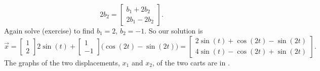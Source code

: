 \begin{example}
\begin{equation*}
2 b_2
=
\begin{bmatrix} b_1+2b_2 \\ 2b_1-2b_2 \end{bmatrix} .
\end{equation*}
Again solve (exercise) to find  $b_1 = 2$, $b_2 = -1$.  So our solution is
\begin{equation*}
\vec{x} = 
\begin{bmatrix} 1 \\ 2 \end{bmatrix}
2 \sin (t)
+
\begin{bmatrix} 1 \\ -1 \end{bmatrix}
\bigl( \cos (2t) - \sin (2t) \bigr)
=
\begin{bmatrix}
2 \sin (t) + \cos(2t)- \sin(2t) \\
4 \sin (t) - \cos(2t) + \sin(2t)
\end{bmatrix} .
\end{equation*}
The graphs of the two displacements, $x_1$ and $x_2$, of the two carts are in
.
\begin{myfig}
\capstart
{}
\caption{Superposition of the two modes given the initial
conditions.\label{sosa:superposfig}}
\end{myfig}
\end{example}

